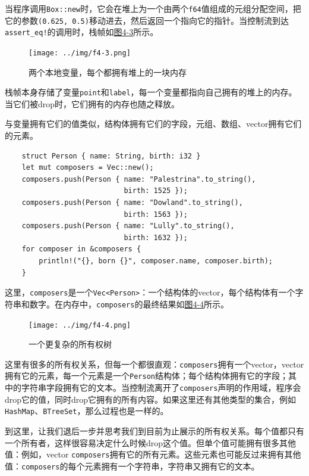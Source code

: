 当程序调用\texttt{Box::new}时，它会在堆上为一个由两个\texttt{f64}值组成的元组分配空间，把它的参数\texttt{(0.625, 0.5)}移动进去，然后返回一个指向它的指针。当控制流到达\texttt{assert\_eq!}的调用时，栈帧如\hyperref[f4-3]{图4-3}所示。

\begin{figure}[htbp]
    \centering
    \texttt{[image: ../img/f4-3.png]}
    \caption{两个本地变量，每个都拥有堆上的一块内存}
    \label{f4-3}
\end{figure}

栈帧本身存储了变量\texttt{point}和\texttt{label}，每一个变量都指向自己拥有的堆上的内存。当它们被drop时，它们拥有的内存也随之释放。

与变量拥有它们的值类似，结构体拥有它们的字段，元组、数组、vector拥有它们的元素。

\begin{verbatim}
    struct Person { name: String, birth: i32 }
    let mut composers = Vec::new();
    composers.push(Person { name: "Palestrina".to_string(),
                            birth: 1525 });
    composers.push(Person { name: "Dowland".to_string(),
                            birth: 1563 });
    composers.push(Person { name: "Lully".to_string(),
                            birth: 1632 });
    for composer in &composers {
        println!("{}, born {}", composer.name, composer.birth);
    }
\end{verbatim}

这里，\texttt{composers}是一个\texttt{Vec<Person>}：一个结构体的vector，每个结构体有一个字符串和数字。在内存中，\texttt{composers}的最终结果如\hyperref[f4-4]{图4-4}所示。

\begin{figure}[htbp]
    \centering
    \texttt{[image: ../img/f4-4.png]}
    \caption{一个更复杂的所有权树}
    \label{f4-4}
\end{figure}

这里有很多的所有权关系，但每一个都很直观：\texttt{composers}拥有一个vector，vector拥有它的元素，每一个元素是一个\texttt{Person}结构体；每个结构体拥有它的字段；其中的字符串字段拥有它的文本。当控制流离开了\texttt{composers}声明的作用域，程序会drop它的值，同时drop它拥有的所有内容。如果这里还有其他类型的集合，例如\texttt{HashMap}、\texttt{BTreeSet}，那么过程也是一样的。

到这里，让我们退后一步并思考我们到目前为止展示的所有权关系。每个值都只有一个所有者，这样很容易决定什么时候drop这个值。但单个值可能拥有很多其他值：例如，vector \texttt{composers}拥有它的所有元素。这些元素也可能反过来拥有其他值：\texttt{composers}的每个元素拥有一个字符串，字符串又拥有它的文本。

